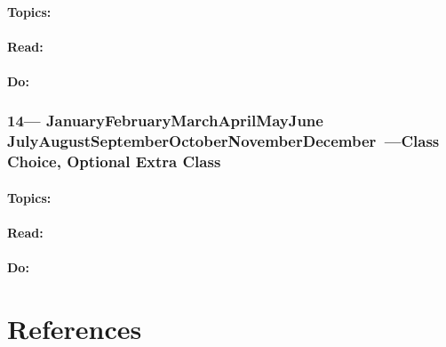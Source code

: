 \documentclass[10pt]{article}
\def\themonth{\ifcase\month\or
	January\or February\or March\or April\or May\or June\or
	July\or August\or September\or October\or November\or December\fi}
\begin{document}
\subsection{Topics:}
\subsection{Read:}
\subsection{Do:}

\AdvanceDate[7]
\section{14---\themonth~\the\day---Class Choice, Optional Extra Class}
\subsection{Topics:}
\subsection{Read:}
\subsection{Do:}

\part{References}


  
\end{document}
